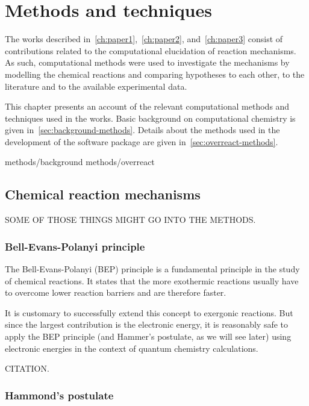 \chapter{Methods and techniques}%
\label{ch:methods}

The works described in~\cref{ch:paper1},~\cref{ch:paper2}, and~\cref{ch:paper3} consist of contributions related to the computational
elucidation of reaction mechanisms.
As such, computational methods were used to investigate the mechanisms by
modelling the chemical reactions and comparing hypotheses to each other,
to the literature and to the available experimental data.

This chapter presents an account of the relevant computational methods and
techniques used in the works.
Basic background on computational chemistry is given in~\cref{sec:background-methods}.
Details about the methods used in the development of the \overreact software
package are given in~\cref{sec:overreact-methods}.

{methods/background}
{methods/overreact}

\section{Chemical reaction mechanisms}

SOME OF THOSE THINGS MIGHT GO INTO THE METHODS.\@

\subsection{Bell-Evans-Polanyi principle}

The Bell-Evans-Polanyi (BEP) principle is a fundamental principle in the study
of chemical reactions.
It states that the more exothermic reactions usually have to overcome lower
reaction barriers and are therefore faster.

It is customary to successfully extend this concept to exergonic reactions.
But since the largest contribution is the electronic energy, it is reasonably
safe to apply the BEP principle (and Hammer's postulate, as we will see later)
using electronic energies in the context of quantum chemistry calculations.

CITATION.\@

\subsection{Hammond's postulate}

